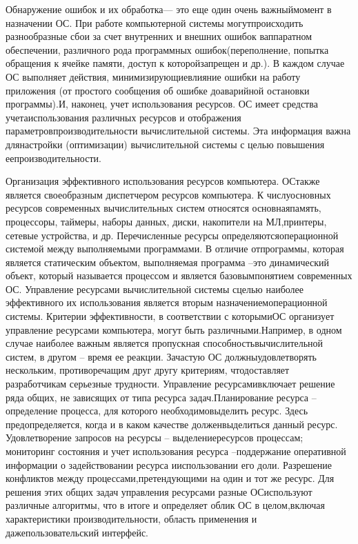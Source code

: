Обнаружение ошибок и их обработка— это еще один очень важныймомент   в   назначении   ОС.   При   работе   компьютерной   системы   могутпроисходить разнообразные сбои за счет внутренних и внешних ошибок ваппаратном   обеспечении,   различного   рода   программных   ошибок(переполнение,   попытка   обращения   к   ячейке   памяти,   доступ   к   которойзапрещен и др.). В каждом случае ОС выполняет действия, минимизирующиевлияние ошибки на работу приложения (от простого сообщения об ошибке доаварийной остановки программы).И, наконец, учет использования ресурсов. ОС  имеет средства учетаиспользования   различных   ресурсов   и   отображения   параметровпроизводительности  вычислительной системы. Эта информация важна длянастройки (оптимизации) вычислительной системы с целью повышения еепроизводительности.~\cite{Oc1}

Организация   эффективного   использования   ресурсов   компьютера.   ОСтакже является своеобразным диспетчером ресурсов компьютера. К числуосновных ресурсов современных вычислительных систем относятся основнаяпамять, процессоры,   таймеры, наборы данных, диски, накопители на МЛ,принтеры, сетевые устройства, и др. Перечисленные ресурсы определяютсяоперационной системой между выполняемыми программами. В отличие отпрограммы, которая является статическим объектом, выполняемая программа –это динамический объект, который называется процессом и является базовымпонятием современных ОС. Управление ресурсами вычислительной системы сцелью наиболее эффективного их использования является вторым назначениемоперационной системы. Критерии эффективности, в соответствии с которымиОС организует управление ресурсами компьютера, могут быть различными.Например, в одном случае наиболее важным является пропускная способностьвычислительной систем, в другом – время ее реакции. Зачастую ОС должныудовлетворять   нескольким,   противоречащим   друг   другу   критериям,   чтодоставляет   разработчикам   серьезные   трудности.   Управление   ресурсамивключает решение ряда общих, не зависящих от типа ресурса задач.Планирование ресурса – определение процесса, для которого необходимовыделить ресурс. Здесь предопределяется, когда и в каком качестве долженвыделиться данный ресурс. Удовлетворение запросов на ресурсы – выделениересурсов процессам; мониторинг состояния и учет использования ресурса –поддержание   оперативной   информации   о   задействовании   ресурса   ииспользовании   его   доли.   Разрешение   конфликтов   между   процессами,претендующими на один и тот же ресурс. Для   решения   этих   общих   задач   управления   ресурсами   разные   ОСиспользуют различные алгоритмы, что в итоге и определяет облик ОС в целом,включая   характеристики   производительности,   область   применения   и   дажепользовательский интерфейс.~\cite{Oc1}

